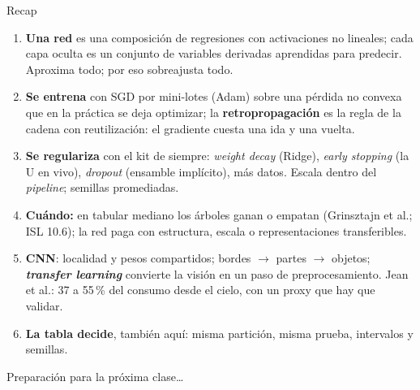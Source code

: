 \documentclass{beamer}
\newcommand{\1}{\mathbb{I}}
\begin{document}
\begin{frame}{Recap}
\small
\begin{enumerate}\itemsep3pt
  \item \textbf{Una red} es una composición de regresiones con activaciones no lineales; cada capa oculta es un conjunto de variables derivadas aprendidas para predecir. Aproxima todo; por eso sobreajusta todo.
  \item \textbf{Se entrena} con SGD por mini-lotes (Adam) sobre una pérdida no convexa que en la práctica se deja optimizar; la \textbf{retropropagación} es la regla de la cadena con reutilización: el gradiente cuesta una ida y una vuelta.
  \item \textbf{Se regulariza} con el kit de siempre: \emph{weight decay} (Ridge), \emph{early stopping} (la U en vivo), \emph{dropout} (ensamble implícito), más datos. Escala dentro del \emph{pipeline}; semillas promediadas.
  \item \textbf{Cuándo:} en tabular mediano los árboles ganan o empatan (Grinsztajn et al.; ISL 10.6); la red paga con estructura, escala o representaciones transferibles.
  \item \textbf{CNN}: localidad y pesos compartidos; bordes $\rightarrow$ partes $\rightarrow$ objetos; \textbf{\emph{transfer learning}} convierte la visión en un paso de preprocesamiento. Jean et al.: 37 a 55\,\% del consumo desde el cielo, con un proxy que hay que validar.
  \item \textbf{La tabla decide}, también aquí: misma partición, misma prueba, intervalos y semillas.
\end{enumerate}
\end{frame}

\begin{frame}
\vspace{2.0cm}
\Large{Preparación para la próxima clase\ldots}
\end{frame}

\end{document}
